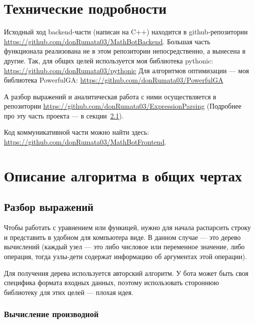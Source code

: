\documentclass[11pt]{article}
\begin{document}
    \section{Технические подробности}

    Исходный ход backend-части (написан на C++) находится в github-репозитории \url{https://github.com/donRumata03/MathBotBackend}.
    Большая часть функционала реализована не в этом репозитории непосредственно, а вынесена в другие.
    Так, для общих целей используется моя библиотека pythonic: \url{https://github.com/donRumata03/pythonic}
    Для алгоритмов оптимизации — моя библиотека PowerfulGA: \url{https://github.com/donRumata03/PowerfulGA}

    А разбор выражений и аналитическая работа с ними осуществляется в репозитории \url{https://github.com/donRumata03/ExpressionParsing}
    (Подробнее про эту часть проекта — в секции~\ref{subsec:expression-parsing}).

    Код коммуникативной части можно найти здесь: \url{https://github.com/donRumata03/MathBotFrontend}.

    \section{Описание алгоритма в общих чертах}

    \subsection{Разбор выражений}\label{subsec:expression-parsing}
    Чтобы работать с уравнением или функицей, нужно для начала распарсить строку и представить в удобном для компьютера виде.
    В данном случае — это дерево вычислений (каждый узел — это либо числовое или переменное значение, либо операция, тогда узлы-дети содержат информацию об аргументах этой операции).

    Для получения дерева используется авторский алгоритм.
    У бота может быть своя специфика формата входных данных, поэтому использовать стороннюю библиотеку для этих целей — плохая идея.

    \subsubsection{Вычисление производной}
\end{document}

